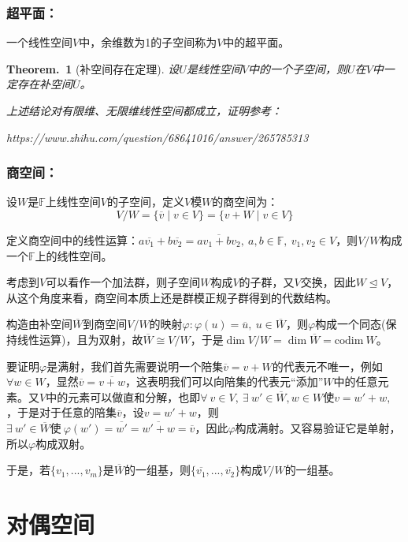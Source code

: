 \documentclass[zihao=5,UTF8]{report}
\theoremstyle{mystyle} %
\newtheorem{theorem}{Theorem.\,}
\begin{document}
\subsubsection{超平面：}一个线性空间$V$中，余维数为1的子空间称为$V$中的超平面。
\begin{theorem}[补空间存在定理]
    设$U$是线性空间$V$中的一个子空间，则$U$在$V$中一定存在补空间$\overline{U}$。
    {\color{ gray} 上述结论对有限维、无限维线性空间都成立，证明参考：\par https://www.zhihu.com/question/68641016/answer/265785313}
\end{theorem}

\subsubsection{商空间：}   
设$W$是$\mathbb{F}$上线性空间$V$的子空间，定义$V$模$W$的商空间为：
\begin{equation*}
    V/W = \{\overline{v}\mid v \in V\}= \{v + W\mid v\in V\}
\end{equation*}\par
定义商空间中的线性运算：$a\overline{v_1} + b\overline{v_2} = \overline{av_1+bv_2},\ a,b \in \mathbb{F},\ v_1,v_2 \in V $，则$V/W$构成一个$\mathbb{F}$上的线性空间。\par
{\color{gray}\small 考虑到$V$可以看作一个加法群，则子空间$W$构成$V$的子群，又$V$交换，因此$W \unlhd V$，从这个角度来看，商空间本质上还是群模正规子群得到的代数结构。}\par
构造由补空间$\overline{W}$到商空间$V/W$的映射$\varphi:\varphi(u) = \overline{u},\ u \in \overline{W}  $，则$\varphi $构成一个同态(保持线性运算)，且为双射，故$\overline{W} \cong  V/W$，于是$\dim V/W = \dim \overline{W} = \text{codim}\ W$。\par
{\color{gray}\small 要证明$\varphi $是满射，我们首先需要说明一个陪集$\overline{v} = v +W$的代表元不唯一，例如$\forall w \in W$，显然$\overline{v} = \overline{v + w}$，这表明我们可以向陪集的代表元“添加”$W$中的任意元素。又$V$中的元素可以做直和分解，也即$\forall\  v \in V,\ \exists\  w' \in \overline{W},w \in W \text{使}v = w' + w,\ $，于是对于任意的陪集$\overline{v}$，设$v = w' + w$，则$\exists\ w' \in \overline{W}\text{使}\  \varphi(w') = \overline{w'} = \overline{w' +w} = \overline{v}$，因此$\varphi$构成满射。又容易验证它是单射，所以$\varphi$构成双射。}\par
于是，若$\{v_1,...,v_m\}$是$\overline{W}$的一组基，则$\{\overline{v_1},...,\overline{v_2}\}$构成$V/W$的一组基。

\section{对偶空间} 
\end{document}
